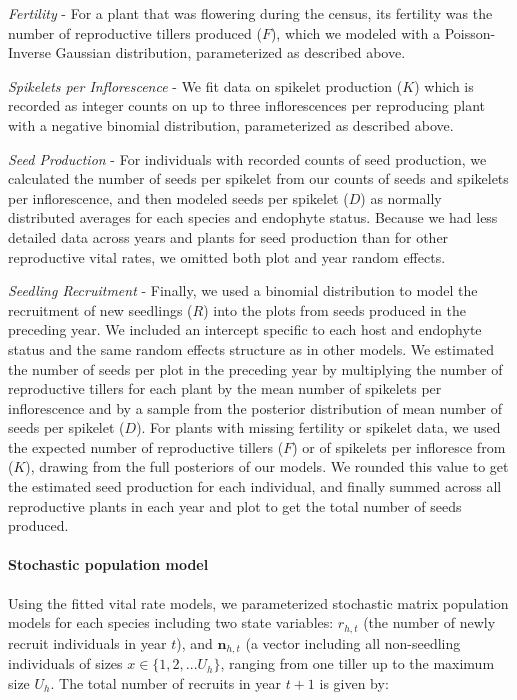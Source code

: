 \documentclass[12pt]{article}
\begin{document}
\emph{Fertility} - For a plant that was flowering during the census, its fertility was the number of reproductive tillers produced ($F$), which we modeled with a Poisson-Inverse Gaussian distribution, parameterized as described above. 

\emph{Spikelets per Inflorescence} - We fit data on spikelet production ($K$) which is recorded as integer counts on up to three inflorescences per reproducing plant with a negative binomial distribution, parameterized as described above. 

\emph{Seed Production} - For individuals with recorded counts of seed production, we calculated the number of seeds per spikelet from our counts of seeds and spikelets per inflorescence, and then modeled seeds per spikelet ($D$) as normally distributed averages for each species and endophyte status. 
Because we had less detailed data across years and plants for seed production than for other reproductive vital rates, we omitted both plot and year random effects. 

\emph{Seedling Recruitment} - Finally, we used a binomial distribution to model the recruitment of new seedlings ($R$) into the plots from seeds produced in the preceding year. 
We included  an intercept specific to each host and endophyte status and the same random effects structure as in other models. 
We estimated the number of seeds per plot in the preceding year by multiplying the number of reproductive tillers for each plant by the mean number of spikelets per inflorescence and by a sample from the posterior distribution of mean number of seeds per spikelet ($D$).
For plants with missing fertility or spikelet data, we used the expected number of reproductive tillers ($F$) or of spikelets per infloresce from ($K$), drawing from the full posteriors of our models. 
We rounded this value to get the estimated seed production for each individual, and finally summed across all reproductive plants in each year and plot to get the total number of seeds produced. 

\paragraph*{Stochastic population model}
Using the fitted vital rate models, we parameterized stochastic matrix population models for each species including two state variables: $r_{h,t}$ (the number of newly recruit individuals in year $t$), and $\textbf{n}_{h,t}$ (a vector including all non-seedling individuals of sizes $x\in\{1,2,...U_h\} $, ranging from one tiller up to the maximum size $U_h$. 
The total number of recruits in year $t+1$ is given by:
\end{document}

